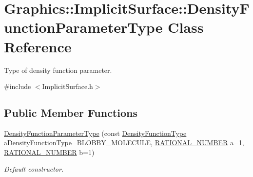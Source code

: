 \hypertarget{class_graphics_1_1_implicit_surface_1_1_density_function_parameter_type}{
\section{Graphics::ImplicitSurface::DensityFunctionParameterType Class Reference}
\label{class_graphics_1_1_implicit_surface_1_1_density_function_parameter_type}
}


Type of density function parameter.  




{\ttfamily \#include $<$ImplicitSurface.h$>$}

\subsection*{Public Member Functions}
\begin{DoxyCompactItemize}
\item 
\hyperlink{class_graphics_1_1_implicit_surface_1_1_density_function_parameter_type_ab5bc60b7b3fa2f295a9b0b93d186924c}{DensityFunctionParameterType} (const \hyperlink{class_graphics_1_1_implicit_surface_ab19cb1eb5b21daefd95b6d007be5c199}{DensityFunctionType} aDensityFunctionType=BLOBBY\_\-MOLECULE, \hyperlink{namespace_utilities_a40969b96bd8d847b962e297cb79f08ce}{RATIONAL\_\-NUMBER} a=1, \hyperlink{namespace_utilities_a40969b96bd8d847b962e297cb79f08ce}{RATIONAL\_\-NUMBER} b=1)
\begin{DoxyCompactList}\small\item\em Default constructor. \end{DoxyCompactList}\end{DoxyCompactItemize}
